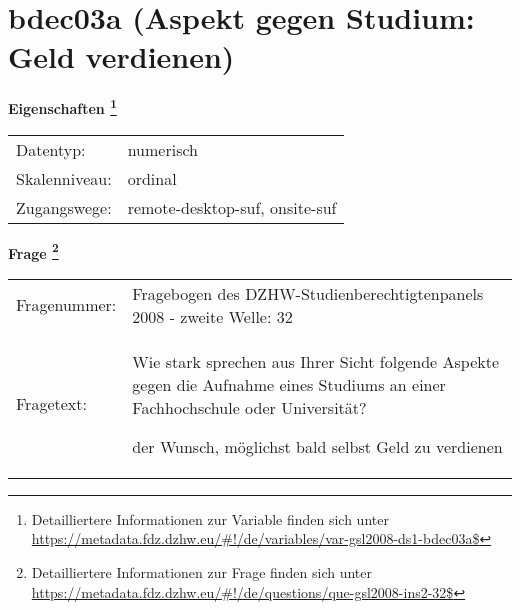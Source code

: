
    \setcounter{footnote}{0}

    \vspace*{-1.8cm}
	\section{bdec03a (Aspekt gegen Studium: Geld verdienen)}
	\label{section:bdec03a}



    \vspace*{0.5cm}
    \noindent\textbf{Eigenschaften
	\footnote{Detailliertere Informationen zur Variable finden sich unter
		\url{https://metadata.fdz.dzhw.eu/\#!/de/variables/var-gsl2008-ds1-bdec03a$}}}\\
	\begin{tabularx}{\hsize}{@{}lX}
	Datentyp: & numerisch \\
	Skalenniveau: & ordinal \\
	Zugangswege: &
	  remote-desktop-suf, 
	  onsite-suf
 \\
    \end{tabularx}



				\vspace*{0.5cm}
                \noindent\textbf{Frage
	                \footnote{Detailliertere Informationen zur Frage finden sich unter
		              \url{https://metadata.fdz.dzhw.eu/\#!/de/questions/que-gsl2008-ins2-32$}}}\\
				\begin{tabularx}{\hsize}{@{}lX}
					Fragenummer: &
					  Fragebogen des DZHW-Studienberechtigtenpanels 2008 - zweite Welle:
					  32
 \\
					Fragetext: & Wie stark sprechen aus Ihrer Sicht folgende Aspekte gegen die Aufnahme eines Studiums an einer Fachhochschule oder Universität?\par  der Wunsch, möglichst bald selbst Geld zu verdienen \\
				\end{tabularx}





